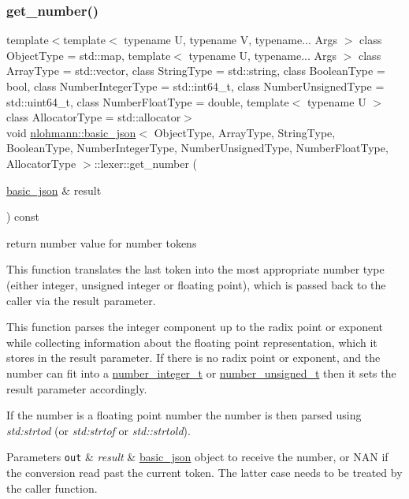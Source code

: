 \subsubsection{\texorpdfstring{get\+\_\+number()}{get\_number()}}
{\footnotesize\ttfamily template$<$template$<$ typename U, typename V, typename... Args $>$ class Object\+Type = std\+::map, template$<$ typename U, typename... Args $>$ class Array\+Type = std\+::vector, class String\+Type  = std\+::string, class Boolean\+Type  = bool, class Number\+Integer\+Type  = std\+::int64\+\_\+t, class Number\+Unsigned\+Type  = std\+::uint64\+\_\+t, class Number\+Float\+Type  = double, template$<$ typename U $>$ class Allocator\+Type = std\+::allocator$>$ \\
void \hyperlink{classnlohmann_1_1basic__json}{nlohmann\+::basic\+\_\+json}$<$ Object\+Type, Array\+Type, String\+Type, Boolean\+Type, Number\+Integer\+Type, Number\+Unsigned\+Type, Number\+Float\+Type, Allocator\+Type $>$\+::lexer\+::get\+\_\+number (\begin{DoxyParamCaption}\item[{\hyperlink{classnlohmann_1_1basic__json}{basic\+\_\+json} \&}]{result }\end{DoxyParamCaption}) const\hspace{0.3cm}{\ttfamily [inline]}}



return number value for number tokens 

This function translates the last token into the most appropriate number type (either integer, unsigned integer or floating point), which is passed back to the caller via the result parameter.

This function parses the integer component up to the radix point or exponent while collecting information about the \textquotesingle{}floating point representation\textquotesingle{}, which it stores in the result parameter. If there is no radix point or exponent, and the number can fit into a \hyperlink{classnlohmann_1_1basic__json_ac4b10b2364f26ce47bdb9a413ff04a59}{number\+\_\+integer\+\_\+t} or \hyperlink{classnlohmann_1_1basic__json_a60a04166c122072ab11eaf9845d9cd1d}{number\+\_\+unsigned\+\_\+t} then it sets the result parameter accordingly.

If the number is a floating point number the number is then parsed using {\itshape std\+:strtod} (or {\itshape std\+:strtof} or {\itshape std\+::strtold}).


\begin{DoxyParams}[1]{Parameters}
\mbox{\tt out}  & {\em result} & \hyperlink{classnlohmann_1_1basic__json}{basic\+\_\+json} object to receive the number, or N\+AN if the conversion read past the current token. The latter case needs to be treated by the caller function. \\
\hline
\end{DoxyParams}
\hypertarget{classnlohmann_1_1basic__json_1_1lexer_a51f08b90ba057e1d29fced3b93cb60b3}{}\label{classnlohmann_1_1basic__json_1_1lexer_a51f08b90ba057e1d29fced3b93cb60b3} 
